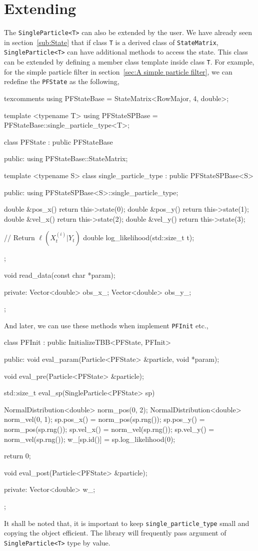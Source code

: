 \section{Extending \protect\spt}
\label{sec:Extending SP}

The \verb|SingleParticle<T>| can also be extended by the user. We have already
seen in section~\ref{sub:State} that if class \verb|T| is a derived class of
\verb|StateMatrix|, \verb|SingleParticle<T>| can have additional methods to
access the state. This class can be extended by defining a member class
template inside class \verb|T|. For example, for the simple particle filter in
section~\ref{sec:A simple particle filter}, we can redefine the \verb|PFState|
as the following,
\begin{cppcode*}{texcomments}
  using PFStateBase = StateMatrix<RowMajor, 4, double>;

  template <typename T>
  using PFStateSPBase = PFStateBase::single_particle_type<T>;

  class PFState : public PFStateBase
  {
      public:
      using PFStateBase::StateMatrix;

      template <typename S>
      class single_particle_type : public PFStateSPBase<S>
      {
          public:
          using PFStateSPBase<S>::single_particle_type;

          double &pos_x() { return this->state(0); }
          double &pos_y() { return this->state(1); }
          double &vel_x() { return this->state(2); }
          double &vel_y() { return this->state(3); }

          // Return $\ell(X_t^{(i)}|Y_t)$
          double log_likelihood(std::size_t t);
      };

      void read_data(const char *param);

      private:
      Vector<double> obs_x_;
      Vector<double> obs_y_;
  };
\end{cppcode*}
And later, we can use these methods when implement \verb|PFInit| etc.,
\begin{cppcode}
  class PFInit : public InitializeTBB<PFState, PFInit>
  {
      public:
      void eval_param(Particle<PFState> &particle, void *param);

      void eval_pre(Particle<PFState> &particle);

      std::size_t eval_sp(SingleParticle<PFState> sp)
      {
          NormalDistribution<double> norm_pos(0, 2);
          NormalDistribution<double> norm_vel(0, 1);
          sp.pos_x() = norm_pos(sp.rng());
          sp.pos_y() = norm_pos(sp.rng());
          sp.vel_x() = norm_vel(sp.rng());
          sp.vel_y() = norm_vel(sp.rng());
          w_[sp.id()] = sp.log_likelihood(0);

          return 0;
      }

      void eval_post(Particle<PFState> &particle);

      private:
      Vector<double> w_;
  };
\end{cppcode}
It shall be noted that, it is important to keep \verb|single_particle_type|
small and copying the object efficient. The library will frequently pass
argument of \verb|SingleParticle<T>| type by value.

